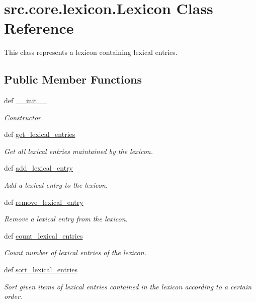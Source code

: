 \hypertarget{classsrc_1_1core_1_1lexicon_1_1_lexicon}{\section{src.\+core.\+lexicon.\+Lexicon Class Reference}
\label{classsrc_1_1core_1_1lexicon_1_1_lexicon}
}


This class represents a lexicon containing lexical entries.  


\subsection*{Public Member Functions}
\begin{DoxyCompactItemize}
\item 
def \hyperlink{classsrc_1_1core_1_1lexicon_1_1_lexicon_a4e1bde14f0dab23d8b6462beb438a3b8}{\+\_\+\+\_\+init\+\_\+\+\_\+}
\begin{DoxyCompactList}\small\item\em Constructor. \end{DoxyCompactList}\item 
def \hyperlink{classsrc_1_1core_1_1lexicon_1_1_lexicon_ab86f6df343dcce5256e00df0876d00dc}{get\+\_\+lexical\+\_\+entries}
\begin{DoxyCompactList}\small\item\em Get all lexical entries maintained by the lexicon. \end{DoxyCompactList}\item 
def \hyperlink{classsrc_1_1core_1_1lexicon_1_1_lexicon_ae07f5ea7bb47595d8f0559910663c66e}{add\+\_\+lexical\+\_\+entry}
\begin{DoxyCompactList}\small\item\em Add a lexical entry to the lexicon. \end{DoxyCompactList}\item 
def \hyperlink{classsrc_1_1core_1_1lexicon_1_1_lexicon_a50ea2e94e8faf8d4d653695cd573af06}{remove\+\_\+lexical\+\_\+entry}
\begin{DoxyCompactList}\small\item\em Remove a lexical entry from the lexicon. \end{DoxyCompactList}\item 
def \hyperlink{classsrc_1_1core_1_1lexicon_1_1_lexicon_ab3f928e814243282a8dc81745cc3b8a5}{count\+\_\+lexical\+\_\+entries}
\begin{DoxyCompactList}\small\item\em Count number of lexical entries of the lexicon. \end{DoxyCompactList}\item 
def \hyperlink{classsrc_1_1core_1_1lexicon_1_1_lexicon_a650614d631962184f7aeca94569c6245}{sort\+\_\+lexical\+\_\+entries}
\begin{DoxyCompactList}\small\item\em Sort given items of lexical entries contained in the lexicon according to a certain order. \end{DoxyCompactList}\end{DoxyCompactItemize}
